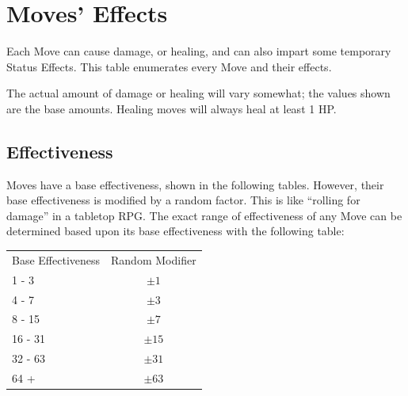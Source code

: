 \documentclass[10pt,twocolumn]{memoir}
\begin{document}
\begin{description}

\end{description}

\section{Moves' Effects}\label{sec:MovesTable}

Each  Move can  cause  damage,  or healing,  and  can  also impart  some
temporary  Status   Effects.  This  table  enumerates   every  Move  and
their effects.

The actual  amount of damage or  healing will vary somewhat;  the values
shown are the base amounts. Healing moves will always heal at least 1 HP.

\subsection{Effectiveness}

Moves have a base effectiveness, shown in the following tables. However,
their base  effectiveness is modified by  a random factor. This  is like
``rolling  for  damage''   in  a  tabletop  RPG.  The   exact  range  of
effectiveness  of  any  Move  can  be determined  based  upon  its  base
effectiveness with the following table:

\begin{tabular}{l c}
  Base Effectiveness & Random Modifier \\
  1 - 3 & $\pm 1$ \\
  4 - 7 & $\pm 3$ \\
  8 - 15 & $\pm 7$ \\
  16 - 31 & $\pm 15$ \\
  32 - 63 & $\pm 31$ \\
  64 + & $\pm 63$ \\
\end{tabular}
\end{document}
